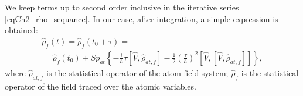 We keep terms up to second order inclusive in the iterative series \eqref{eqCh2_rho_sequance}. In our case, after integration, a simple expression is obtained:
\begin{eqnarray}
\hat{\rho}_{f}\left(t\right) =
\hat{\rho}_{f}\left(t_0 + \tau\right) = 
\nonumber \\
= \hat{\rho}_{f}\left(t_0\right) +
Sp_{at}
\left\{
- \frac{i}{\hbar}\tau\left[\hat{V}, \hat{\rho}_{at, f}\right]
- \frac{1}{2} \left(\frac{\tau}{\hbar}\right)^2
\left[\hat{V},\left[\hat{V}, \hat{\rho}_{at, f}
\right]\right]
\right\}, 
\label{eqCh2_task4}
\end{eqnarray}
where $\hat{\rho}_{at, f}$ is the statistical operator of the atom-field system;
$\hat{\rho}_{f}$ is the statistical operator of the field traced over the atomic variables.
  
